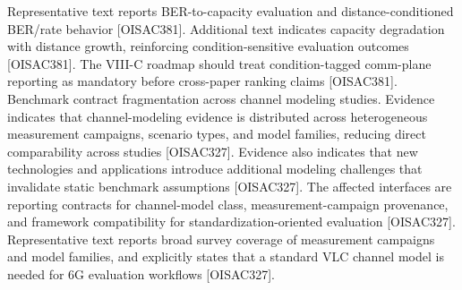  Representative text reports BER-to-capacity evaluation and distance-conditioned BER/rate behavior [O\markdownRendererUnderscore{}ISAC\markdownRendererUnderscore{}381]. Additional text indicates capacity degradation with distance growth, reinforcing condition-sensitive evaluation outcomes [O\markdownRendererUnderscore{}ISAC\markdownRendererUnderscore{}381].\markdownRendererOlItemEnd 
{} The VIII-C roadmap should treat condition-tagged comm-plane reporting as mandatory before cross-paper ranking claims [O\markdownRendererUnderscore{}ISAC\markdownRendererUnderscore{}381].\markdownRendererOlItemEnd 
\markdownRendererOlEnd \markdownRendererInterblockSeparator
{}
\markdownRendererSectionEnd \markdownRendererSectionBegin
{}\markdownRendererInterblockSeparator
{}\markdownRendererOlBegin
{} Benchmark contract fragmentation across channel modeling studies.\markdownRendererOlItemEnd 
{} Evidence indicates that channel-modeling evidence is distributed across heterogeneous measurement campaigns, scenario types, and model families, reducing direct comparability across studies [O\markdownRendererUnderscore{}ISAC\markdownRendererUnderscore{}327]. Evidence also indicates that new technologies and applications introduce additional modeling challenges that invalidate static benchmark assumptions [O\markdownRendererUnderscore{}ISAC\markdownRendererUnderscore{}327].\markdownRendererOlItemEnd 
{} The affected interfaces are reporting contracts for channel-model class, measurement-campaign provenance, and framework compatibility for standardization-oriented evaluation [O\markdownRendererUnderscore{}ISAC\markdownRendererUnderscore{}327].\markdownRendererOlItemEnd 
{} Representative text reports broad survey coverage of measurement campaigns and model families, and explicitly states that a standard VLC channel model is needed for 6G evaluation workflows [O\markdownRendererUnderscore{}ISAC\markdownRendererUnderscore{}327].\markdownRendererOlItemEnd 
